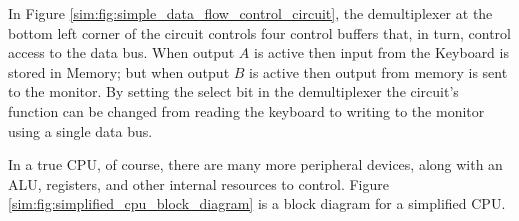 \begin{figure}[H]
\end{figure}

In Figure \ref{sim:fig:simple_data_flow_control_circuit}, the demultiplexer at the bottom left corner of the circuit controls four control buffers that, in turn, control access to the data bus. When output $ A $ is active then input from the Keyboard is stored in Memory; but when output $ B $ is active then output from memory is sent to the monitor. By setting the select bit in the demultiplexer the circuit's function can be changed from reading the keyboard to writing to the monitor using a single data bus.

In a true \ac{CPU}, of course, there are many more peripheral devices, along with an \ac{ALU}, registers, and other internal resources to control. Figure \ref{sim:fig:simplified_cpu_block_diagram} is a block diagram for a simplified \ac{CPU}.

